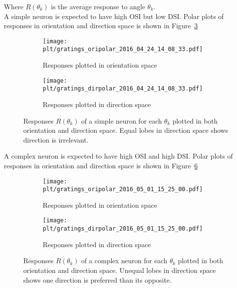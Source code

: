 \documentclass[MTech]{iitmdiss}
\newcommand{\plt}{thesis_plots}
\begin{document}
Where $R(\theta_k)$ is the average response to angle $\theta_k$.\\
A simple neuron is expected to have high OSI but low DSI. Polar plots of responses in orientation and direction space is shown in Figure~\ref{fig:oridir_simple}
\begin{figure}[h]
  \begin{subfigure}[b]{0.5\textwidth}
    \texttt{[image: \\plt/gratings\_oripolar\_2016\_04\_24\_14\_08\_33.pdf]}
    \caption{Responses plotted in orientation space}
    \label{fig:ori_simple}
  \end{subfigure}%
  \begin{subfigure}[b]{0.5\textwidth}
    \texttt{[image: \\plt/gratings\_dirpolar\_2016\_04\_24\_14\_08\_33.pdf]}
    \caption{Responses plotted in direction space}
    \label{fig:dir_simple}
  \end{subfigure}%
  \caption{Responses $R(\theta_k)$ of a simple neuron for each $\theta_k$ plotted in both orientation and direction space. Equal lobes in direction space shows direction is irrelevant.}\label{fig:oridir_simple}
\end{figure}

A complex neuron is expected to have high OSI and high DSI. Polar plots of responses in orientation and direction space is shown in Figure~\ref{fig:oridir_complex}
\begin{figure}[h]
  \begin{subfigure}[b]{0.5\textwidth}
    \texttt{[image: \\plt/gratings\_oripolar\_2016\_05\_01\_15\_25\_00.pdf]}
    \caption{Responses plotted in orientation space}
    \label{fig:ori_complex}
  \end{subfigure}%
  \begin{subfigure}[b]{0.5\textwidth}
    \texttt{[image: \\plt/gratings\_dirpolar\_2016\_05\_01\_15\_25\_00.pdf]}
    \caption{Responses plotted in direction space}
    \label{fig:dir_complex}
  \end{subfigure}%
  \caption{Responses $R(\theta_k)$ of a complex neuron for each $\theta_k$ plotted in both orientation and direction space. Unequal lobes in direction space shows one direction is preferred than its opposite.}\label{fig:oridir_complex}
\end{figure}
\end{document}
